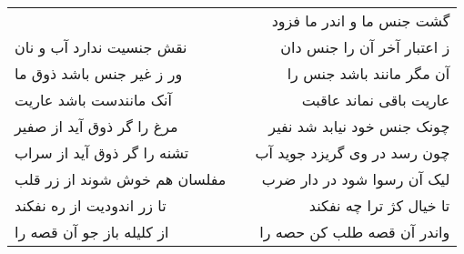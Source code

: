 \begin{center}
\begin{longtable}{l p{0.5cm} r}
&&
گشت جنس ما و اندر ما فزود
\\
نقش جنسیت ندارد آب و نان
&&
ز اعتبار آخر آن را جنس دان
\\
ور ز غیر جنس باشد ذوق ما
&&
آن مگر مانند باشد جنس را
\\
آنک مانندست باشد عاریت
&&
عاریت باقی نماند عاقبت
\\
مرغ را گر ذوق آید از صفیر
&&
چونک جنس خود نیابد شد نفیر
\\
تشنه را گر ذوق آید از سراب
&&
چون رسد در وی گریزد جوید آب
\\
مفلسان هم خوش شوند از زر قلب
&&
لیک آن رسوا شود در دار ضرب
\\
تا زر اندودیت از ره نفکند
&&
تا خیال کژ ترا چه نفکند
\\
از کلیله باز جو آن قصه را
&&
واندر آن قصه طلب کن حصه را
\\
\end{longtable}
\end{center}
